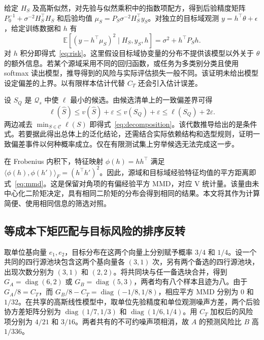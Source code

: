\documentclass[UTF8,fontset=fandol,scheme=chinese,zihao=false,11pt,letterpaper]{ctexart}
\newcommand{\E}{\mathbb{E}}
\newcommand{\cC}{\mathcal{C}}
\newcommand{\cQ}{\mathcal{Q}}
\begin{document}
给定 $H_S$ 及高斯似然，对先验与似然乘积中的指数项配方，得到后验精度矩阵 $P_0^{-1}+\sigma^{-2}H_S^\top H_S$ 和后验均值 $\mu_S=P_S\sigma^{-2}H_S^\top y_S$。对独立的目标域观测 $y=h^\top\theta+\epsilon$，给定训练数据和 $h$ 有
\begin{equation}
 \E[(y-h^\top\mu_S)^2\mid H_S,y_S,h]=\sigma^2+h^\top P_Sh.
\end{equation}
对 $h$ 积分即得式~\eqref{eq:risk}。这里假设目标域协变量的分布不提供该模型以外关于 $\theta$ 的额外信息。若某个源域采用不同的回归函数，或任务为多类别分类且使用 softmax 读出模型，推导得到的风险与实际评估损失一般不同。该证明未给出模型设定偏差的上界。以有限样本估计代替 $C_T$ 还会引入估计误差。

设 $S_Q$ 是 $\cQ_s$ 中使 $\ell$ 最小的候选。由候选清单上的一致偏差界可得
\begin{equation}
 \ell(\widehat S)\leq v(\widehat S)+\varepsilon
 \leq v(S_Q)+\varepsilon\leq\ell(S_Q)+2\varepsilon.
\end{equation}
两边减去 $\min_{S\in\cC}\ell(S)$ 即得式~\eqref{eq:decomposition}。该代数推导给出的是条件式。若要据此得出总体上的泛化结论，还需结合实际依赖结构和选型规则，证明一致偏差事件以何种概率成立。仅在有限测试集上穷举候选无法完成这一步。

在 Frobenius 内积下，特征映射 $\phi(h)=hh^\top$ 满足 $\langle\phi(h),\phi(h')\rangle_F=(h^\top h')^2$。因此，源域和目标域经验特征均值的平方距离即式~\eqref{eq:mmd}。这是保留对角项的有偏经验平方 MMD，对应 V 统计量。该量由未中心化二阶矩决定，具有相同二阶矩的分布会得到相同的结果。本文将其作为计算简便、使用相同信息的筛选对照。

\subsection{等成本下矩匹配与目标风险的排序反转}
\label{app:equal-cost-reversal}
取单位基向量 $e_1,e_2$，目标分布在这两个向量上分别赋予概率 $3/4$ 和 $1/4$。设一个共同的四行源池块包含这两个基向量各 $(3,1)$ 次，另有两个备选的四行源池块，出现次数分别为 $(3,1)$ 和 $(2,2)$。将共同块与任一备选块合并，得到 $G_A=\operatorname{diag}(6,2)$ 或 $G_B=\operatorname{diag}(5,3)$，两者均有八个样本且迹为八。由于 $G_A/8=C_T$，而 $G_B/8-C_T=\operatorname{diag}(-1/8,1/8)$，相应平方 MMD 分别为 $0$ 和 $1/32$。在共享的高斯线性模型中，取单位先验精度和单位观测噪声方差，两个后验协方差矩阵分别为 $\operatorname{diag}(1/7,1/3)$ 和 $\operatorname{diag}(1/6,1/4)$。用 $C_T$ 加权后的风险项分别为 $4/21$ 和 $3/16$。两者共有的不可约噪声项相消，故 $A$ 的预测风险比 $B$ 高 $1/336$。
\end{document}

